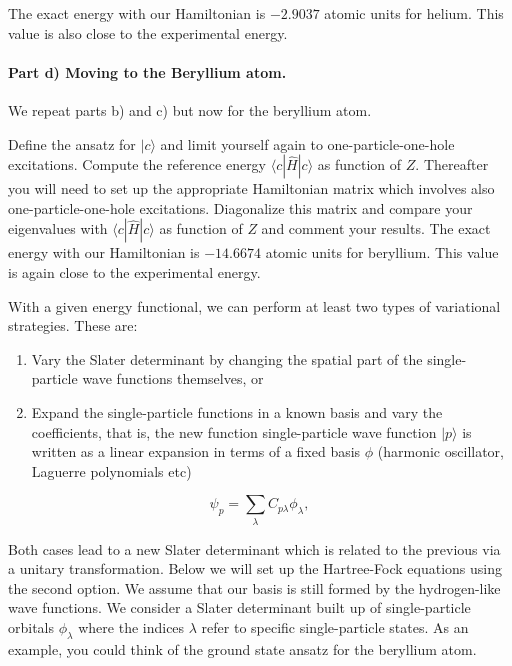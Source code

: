 \documentclass[a4,10pt]{article}
\begin{document}
The exact energy with our Hamiltonian is $-2.9037$ atomic units for
helium. This value is also close to the experimental energy.

\paragraph{Part d) Moving to the Beryllium atom.}
We repeat parts b) and c) but now for the beryllium atom.

Define the ansatz for $|c\rangle$ and limit yourself again to
one-particle-one-hole excitations.  Compute the reference energy
$\langle c | \hat{H}| c \rangle $ as function of $Z$. Thereafter you
will need to set up the appropriate Hamiltonian matrix which involves
also one-particle-one-hole excitations. Diagonalize this matrix and
compare your eigenvalues with $\langle c | \hat{H}| c \rangle$ as
function of $Z$ and comment your results.  The exact energy with our
Hamiltonian is $-14.6674$ atomic units for beryllium. This value is
again close to the experimental energy.

With a given energy
functional, we can perform at least two types of variational strategies. These are:

\begin{enumerate}
\item Vary the Slater determinant by changing the spatial part of the single-particle wave functions themselves, or

\item Expand the single-particle functions in a known basis  and vary the coefficients,  that is, the new function single-particle wave function $|p\rangle$ is written as a linear expansion in terms of a fixed basis $\phi$ (harmonic oscillator, Laguerre polynomials etc)  
\end{enumerate}

\noindent
\begin{equation*} 
\psi_p  = \sum_{\lambda} C_{p\lambda}\phi_{\lambda},
\end{equation*}

Both cases lead to a new Slater determinant which is related to the
previous via a unitary transformation.  Below we will set up the
Hartree-Fock equations using the second option.  We assume that our
basis is still formed by the hydrogen-like wave functions.  We
consider a Slater determinant built up of single-particle orbitals
$\phi_{\lambda}$ where the indices $\lambda$ refer to specific
single-particle states.  As an example, you could think of the ground
state ansatz for the beryllium atom.
\end{document}
